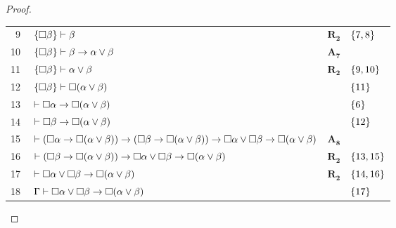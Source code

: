 \begin{tcolorbox}[enhanced jigsaw, breakable, sharp corners, colframe=black, colback=white, boxrule=0.5pt, left=1.5mm, right=1.5mm, top=1.5mm, bottom=1.5mm]
\begin{lemma}
\begin{proof}
\begin{xltabular}{\textwidth}{r | X l l}
            \scriptsize{\phantom{0}9}\phantom{ } & $\ \set{\nec\beta}\vdash\beta$                                                                                                         & $\hyperref[modal.rule.2]{\mathbf{R_2}}$        & $\left\{7,8\right\}$\\[\rowskip]
            \scriptsize{10}\phantom{ }           & $\ \set{\nec\beta}\vdash\beta\to\alpha\vee\beta$                                                                                       & $\hyperref[modal.axiom.7]{\mathbf{A_7}}$       & \\[\rowskip]
            \scriptsize{11}\phantom{ }           & $\ \set{\nec\beta}\vdash\alpha\vee\beta$                                                                                               & $\hyperref[modal.rule.2]{\mathbf{R_2}}$        & $\left\{9,10\right\}$\\[\rowskip]
            \scriptsize{12}\phantom{ }           & $\ \set{\nec\beta}\vdash\nec(\alpha\vee\beta)$                                                                                         &                       & $\left\{11\right\}$\\[\rowskip]
            \scriptsize{13}\phantom{ }           & $\ \vdash\nec\alpha\to\nec(\alpha\vee\beta)$                                                                                           &                            & $\left\{6\right\}$\\[\rowskip]
            \scriptsize{14}\phantom{ }           & $\ \vdash\nec\beta\to\nec(\alpha\vee\beta)$                                                                                            &                            & $\left\{12\right\}$\\[\rowskip]
            \scriptsize{15}\phantom{ }           & $\ \vdash(\nec\alpha\to\nec(\alpha\vee\beta))\to(\nec\beta\to\nec(\alpha\vee\beta))\to\nec\alpha\vee\nec\beta\to\nec(\alpha\vee\beta)$ & $\hyperref[modal.axiom.8]{\mathbf{A_8}}$       & \\[\rowskip]
            \scriptsize{16}\phantom{ }           & $\ \vdash(\nec\beta\to\nec(\alpha\vee\beta))\to\nec\alpha\vee\nec\beta\to\nec(\alpha\vee\beta)$                                        & $\hyperref[modal.rule.2]{\mathbf{R_2}}$        & $\left\{13,15\right\}$\\[\rowskip]
            \scriptsize{17}\phantom{ }           & $\ \vdash\nec\alpha\vee\nec\beta\to\nec(\alpha\vee\beta)$                                                                              & $\hyperref[modal.rule.2]{\mathbf{R_2}}$        & $\left\{14,16\right\}$\\[\rowskip]
            \scriptsize{18}\phantom{ }           & $\ \Gamma\vdash\nec\alpha\vee\nec\beta\to\nec(\alpha\vee\beta)$                                                                        & \phantom{1}                & $\left\{17\right\}$
        \end{xltabular}
        \normalsize


\end{proof}
\end{lemma}
\end{tcolorbox}
